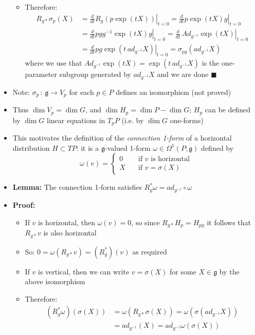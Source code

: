 \documentclass[12pt,a4paper]{article}
\numberwithin{equation}{section}
\begin{document}
\begin{itemize}
\begin{itemize}
			\item Therefore:
			$$
			\begin{aligned}
				R_{g*}\sigma_{p}(X)&=\left.\frac{d}{dt}R_{g}(p\exp(tX))\right\rvert_{t=0}=\left.\frac{d}{dt}p\exp(tX)g\right\rvert_{t=0}\\
				&=\left.\frac{d}{dt}pgg^{-1}\exp(tX)g\right\rvert_{t=0}=\left.\frac{d}{dt}\,Ad_{g^{-1}}\exp(tX)\right\rvert_{t=0}\\&=\left.\frac{d}{dt}pg\exp(t\,ad_{g^{-1}}X)\right\rvert_{t=0}=\sigma_{pg}(ad_{g^{-1}}X)
			\end{aligned}
			$$
			where we use that $Ad_{g^{-1}}\exp(tX)=\exp(t\,ad_{g^{-1}}X)$ is the one-parameter subgroup generated by $ad_{g^{-1}}X$ and we are done $\blacksquare$
		\end{itemize}
		\item Note: $\sigma_{p}\,:\,\mathfrak{g}\to V_{p}$ for each $p\in P$ defines an isomorphism (not proved)
		\item Thus $\dim{V_{p}}=\dim{G}$, and $\dim{H_{p}}=\dim{P}-\dim{G}$; $H_{p}$ can be defined by $\dim{G}$ linear equations in $T_{p}P$ (i.e. by $\dim{G}$ one-forms)
		\item This motivates the definition of the \textit{connection 1-form} of a horizontal distribution $H\subset TP$: it is a $\mathfrak{g}$-valued 1-form $\omega\in\Omega^{1}(P;\mathfrak{g})$ defined by
		\begin{equation}
			\omega(v)=\begin{cases}0\quad&\text{if }v\text{ is horizontal}\\X\quad&\text{if }v=\sigma(X)\end{cases}
		\end{equation}
		\item \textbf{Lemma:} The connection 1-form satisfies $R^{*}_{g}\omega=ad_{g^{-1}}\circ\omega$
		\item \textbf{Proof:}
		\begin{itemize}
			\item If $v$ is horizontal, then $\omega(v)=0$, so since $R_{g*}H_{p}=H_{pg}$ it follows that $R_{g*}v$ is also horizontal
			\item So: $0=\omega(R_{g*}v)=(R^{*}_{g})(v)$ as required
			\item If $v$ is vertical, then we can write $v=\sigma(X)$ for some $X\in\mathfrak{g}$ by the above isomorphism
			\item Therefore:
			$$
			\begin{aligned}
				(R^{*}_{g}\omega)(\sigma(X))&=\omega(R_{g*}\sigma(X))=\omega(\sigma(ad_{g^{-1}}X))\\&=ad_{g^{-1}}(X)=ad_{g^{-1}}\omega(\sigma(X))

\end{aligned}$$
\end{itemize}
\end{itemize}
\end{document}
